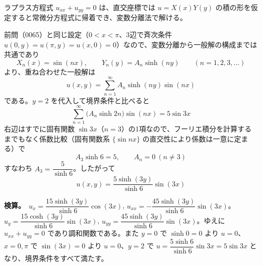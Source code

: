 
ラプラス方程式 $u_{xx} + u_{yy} = 0$ は、直交座標では $u = X(x)Y(y)$ の積の形を仮定すると常微分方程式に帰着でき、変数分離法で解ける。

前問（0065）と同じ設定（$0 < x < \pi$、3辺で斉次条件 $u(0,y)=u(\pi,y)=u(x,0)=0$）なので、変数分離から一般解の構成までは共通であり
\[
X_n(x) = \sin(nx), \qquad Y_n(y) = A_n\sinh(ny) \qquad (n = 1, 2, 3, \dots)
\]
より、重ね合わせた一般解は
\[
u(x,y) = \sum_{n=1}^{\infty} A_n \sinh(ny)\sin(nx)
\]
である。$y = 2$ を代入して境界条件と比べると
\[
\sum_{n=1}^{\infty} \bigl(A_n \sinh 2n\bigr)\sin(nx) = 5\sin 3x
\]
右辺はすでに固有関数 $\sin 3x$（$n=3$）の1項なので、フーリエ積分を計算するまでもなく係数比較（固有関数系 $\{\sin nx\}$ の直交性により係数は一意に定まる）で
\[
A_3 \sinh 6 = 5, \qquad A_n = 0\ (n \neq 3)
\]
すなわち $A_3 = \dfrac{5}{\sinh 6}$。したがって
\[
\boxed{\; u(x,y) = \frac{5\sinh(3y)}{\sinh 6}\sin(3x) \;}
\]

\textbf{検算。}\ $u_x = \dfrac{15\sinh(3y)}{\sinh 6}\cos(3x)$, $u_{xx} = -\dfrac{45\sinh(3y)}{\sinh 6}\sin(3x)$。$u_y = \dfrac{15\cosh(3y)}{\sinh 6}\sin(3x)$, $u_{yy} = \dfrac{45\sinh(3y)}{\sinh 6}\sin(3x)$。ゆえに $u_{xx}+u_{yy}=0$ であり調和関数である。また $y=0$ で $\sinh 0=0$ より $u=0$、$x=0,\pi$ で $\sin(3x)=0$ より $u=0$、$y=2$ で $u = \dfrac{5\sinh 6}{\sinh 6}\sin 3x = 5\sin 3x$ となり、境界条件をすべて満たす。
